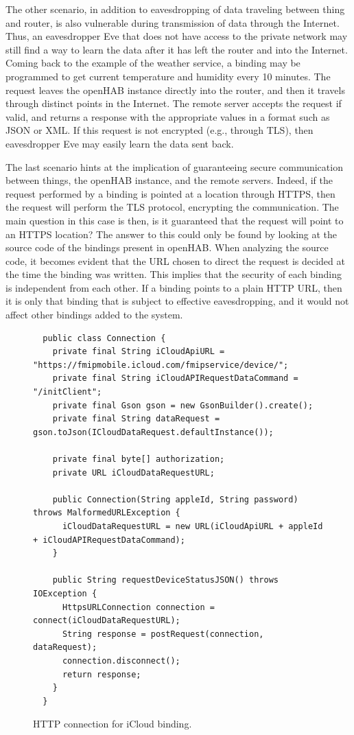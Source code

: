 \documentclass[12pt]{article}
\begin{document}
The other scenario, in addition to eavesdropping of data traveling between thing and router, is also vulnerable during transmission of data through the Internet. Thus, an eavesdropper Eve that does not have access to the private network may still find a way to learn the data after it has left the router and into the Internet. Coming back to the example of the weather service, a binding may be programmed to get current temperature and humidity every 10 minutes. The request leaves the openHAB instance directly into the router, and then it travels through distinct points in the Internet. The remote server accepts the request if valid, and returns a response with the appropriate values in a format such as JSON or XML. If this request is not encrypted (e.g., through TLS), then eavesdropper Eve may easily learn the data sent back.

The last scenario hints at the implication of guaranteeing secure communication between things, the openHAB instance, and the remote servers. Indeed, if the request performed by a binding is pointed at a location through HTTPS, then the request will perform the TLS protocol, encrypting the communication. The main question in this case is then, is it guaranteed that the request will point to an HTTPS location? The answer to this could only be found by looking at the source code of the bindings present in openHAB. When analyzing the source code, it becomes evident that the URL chosen to direct the request is decided at the time the binding was written. This implies that the security of each binding is independent from each other. If a binding points to a plain HTTP URL, then it is only that binding that is subject to effective eavesdropping, and it would not affect other bindings added to the system.

\begin{figure} [htb]
\begin{lstlisting}
  public class Connection {
    private final String iCloudApiURL = "https://fmipmobile.icloud.com/fmipservice/device/";
    private final String iCloudAPIRequestDataCommand = "/initClient";
    private final Gson gson = new GsonBuilder().create();
    private final String dataRequest = gson.toJson(ICloudDataRequest.defaultInstance());
    
    private final byte[] authorization;
    private URL iCloudDataRequestURL;
    
    public Connection(String appleId, String password) throws MalformedURLException {
      iCloudDataRequestURL = new URL(iCloudApiURL + appleId + iCloudAPIRequestDataCommand);
    } 
    
    public String requestDeviceStatusJSON() throws IOException {
      HttpsURLConnection connection = connect(iCloudDataRequestURL);
      String response = postRequest(connection, dataRequest);
      connection.disconnect();    
      return response;
    }
  }
\end{lstlisting}
\caption{HTTP connection for iCloud binding.}
\label{lst:https_binding}
\end{figure}
\end{document}
